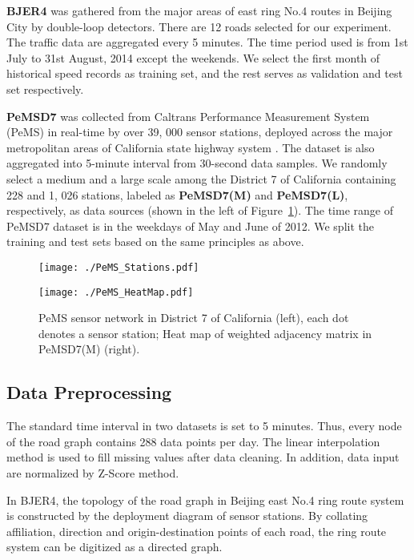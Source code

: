\documentclass{article}
\begin{document}
\textbf{BJER4} was gathered from the major areas of east ring No.4 routes in Beijing City by double-loop detectors. There are 12 roads selected for our experiment. The traffic data are aggregated every 5 minutes. The time period used is from 1st July to 31st August, 2014 except the weekends. We select the first month of historical speed records as training set, and the rest serves as validation and test set respectively.

\textbf{PeMSD7} was collected from Caltrans Performance Measurement System (PeMS) in real-time by over 39, 000 sensor stations, deployed across the major metropolitan areas of California state highway system \cite{chen2001freeway}. The dataset is also aggregated into 5-minute interval from 30-second data samples. We randomly select a medium and a large scale among the District 7 of California containing 228 and 1, 026 stations, labeled as \textbf{PeMSD7(M)} and \textbf{PeMSD7(L)}, respectively, as data sources (shown in the left of Figure~\ref{fig:pems}). The time range of PeMSD7 dataset is in the weekdays of May and June of 2012. We split the training and test sets based on the same principles as above.

\begin{figure}
\begin{minipage}[t]{0.5\linewidth}
\centering
\texttt{[image: ./PeMS\_Stations.pdf]}
\end{minipage}\begin{minipage}[t]{0.5\linewidth}
\centering
\texttt{[image: ./PeMS\_HeatMap.pdf]}
\end{minipage}
\caption{\label{fig:pems}PeMS sensor network in District 7 of California (left), each dot denotes a sensor station; Heat map of weighted adjacency matrix in PeMSD7(M) (right).}
\end{figure}

\subsection{Data Preprocessing}
The standard time interval in two datasets is set to 5 minutes. Thus, every node of the road graph contains 288 data points per day. The linear interpolation method is used to fill missing values after data cleaning. In addition, data input are normalized by Z-Score method.

In BJER4, the topology of the road graph in Beijing east No.4 ring route system is constructed by the deployment diagram of sensor stations. By collating affiliation, direction and origin-destination points of each road, the ring route system can be digitized as a directed graph. 
\end{document}
